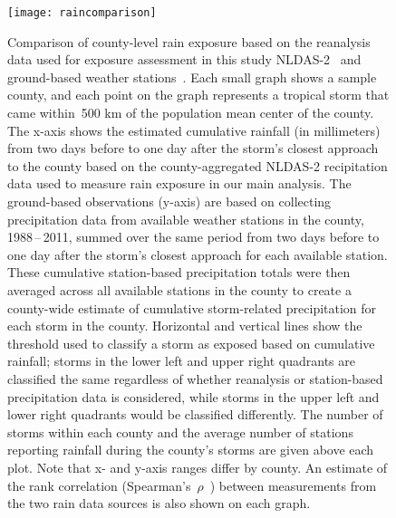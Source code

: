 \begin{figure}[tbhp!] \centering
\texttt{[image: raincomparison]} \caption{Comparison of
county-level rain exposure based on the reanalysis data used for exposure
assessment in this study \ac{NLDAS-2}~\citep{rui2013nldas,
alhamdan2014environmental} and ground-based weather
stations~\citep{menne2012overview, rnoaa, countyweather}. Each small graph
shows a sample county, and each point on the graph represents a tropical storm
that came within~500 \si{\kilo\metre} of the population mean center of the county.
The x-axis shows the estimated cumulative rainfall (in millimeters) from two
days before to one day after the storm's closest approach to the county based
on the county-aggregated \ac{NLDAS-2} recipitation data used to measure rain
exposure in our main analysis. The ground-based observations (y-axis) are based
on collecting precipitation data from available weather stations in the county,
1988\,--\,2011, summed over the same period from two days before to one day
after the storm's closest approach for each available station. These cumulative
station-based precipitation totals were then averaged across all available
stations in the county to create a county-wide estimate of cumulative
storm-related precipitation for each storm in the county. Horizontal and
vertical lines show the threshold used to classify a storm as exposed based on
cumulative rainfall; storms in the lower left and upper right quadrants are
classified the same regardless of whether reanalysis or station-based
precipitation data is considered, while storms in the upper left and lower
right quadrants would be classified differently. The number of storms within
each county and the average number of stations reporting rainfall during the
county's storms are given above each plot. Note that x- and y-axis ranges
differ by county. An estimate of the rank correlation
(Spearman's~$\rho$~\citep{spearman1904proof}) between measurements from the two
rain data sources is also shown on each graph.} \label{fig:raincomparison}
\end{figure}

